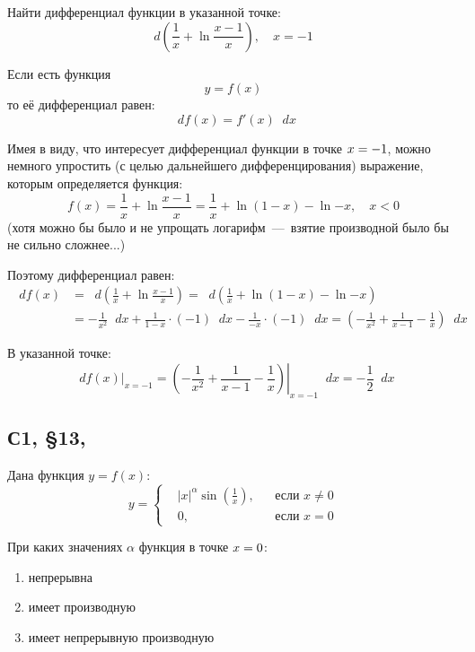 \documentclass[a4paper,12pt]{article}
\newcommand{\diff}{\mathop{}\!d\!}
\begin{document}
  Найти дифференциал функции в указанной точке:
  \[
    d\left(\frac{1}{x} + \ln \frac{x - 1}{x}\right),\quad x = -1
  \]
  
  \begin{solution}
    Если есть функция
    \[
      y = f(x)
    \]
    то её дифференциал равен:
    \[
      \diff f(x) = f'(x) \diff x
    \]

    Имея в виду, что интересует дифференциал функции в точке $x \hm= -1$, можно немного упростить (с целью дальнейшего дифференцирования) выражение, которым определяется функция:
    \[
      f(x) = \frac{1}{x} + \ln \frac{x - 1}{x}
        = \frac{1}{x} + \ln{(1 - x)} - \ln{{-}x},\quad x < 0
    \]
    (хотя можно бы было и не упрощать логарифм~---~взятие производной было бы не сильно сложнее...)

    Поэтому дифференциал равен:
    \begin{equation*}
    \begin{split}
      \diff f(x) &= \diff \left(\frac{1}{x} + \ln \frac{x - 1}{x}\right)
        = \diff \left(\frac{1}{x} + \ln{(1 - x)} - \ln{-x}\right)\\
        &= -\frac{1}{x^2} \diff x + \frac{1}{1 - x} \cdot (-1) \diff x - \frac{1}{-x} \cdot (-1) \diff x
        = \left(-\frac{1}{x^2} + \frac{1}{x - 1} - \frac{1}{x}\right) \diff x
    \end{split}
    \end{equation*}

    В указанной точке:
    \[
      \diff f(x)|_{x = -1}
        = \left.\left(-\frac{1}{x^2} + \frac{1}{x - 1} - \frac{1}{x}\right)\right|_{x = -1} \diff x
        = -\frac{1}{2} \diff x
    \]
  \end{solution}

  
  \subsection{С1, \S 13, }

  Дана функция $y = f(x)$:
  \[
    y = \left\{
      \begin{aligned}
        &|x|^{\alpha} \sin{\left(\frac{1}{x}\right)}, & &\mbox{если } x \not= 0\\
        &0, & &\mbox{если } x = 0
      \end{aligned}
    \right.
  \]
  
  При каких значениях $\alpha$ функция в точке $x \hm= 0$:
  \begin{enumerate}
    \item непрерывна
    \item имеет производную
    \item имеет непрерывную производную
  \end{enumerate}
  
\end{document}
